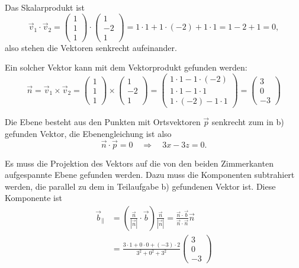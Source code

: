 \begin{loesung}
\begin{teilaufgaben}
\item Das Skalarprodukt ist
\[
\vec v_1\cdot\vec v_2
=
\begin{pmatrix}
1\\1\\1
\end{pmatrix}
\cdot
\begin{pmatrix}
1\\-2\\1
\end{pmatrix}
=1\cdot 1+1\cdot(-2)+1\cdot 1=1-2+1=0,
\]
also stehen die Vektoren senkrecht aufeinander.
\item Ein solcher Vektor kann mit dem Vektorprodukt gefunden werden:
\[
\vec n=\vec v_1\times\vec v_2
=
\begin{pmatrix}
1\\1\\1
\end{pmatrix}
\times
\begin{pmatrix}
1\\-2\\1
\end{pmatrix}
=
\begin{pmatrix}
1\cdot 1-1\cdot(-2)\\
1\cdot 1-1\cdot 1\\
1\cdot(-2)-1\cdot 1
\end{pmatrix}
=
\begin{pmatrix}
3\\0\\-3
\end{pmatrix}
\]
\item
Die Ebene besteht aus den Punkten mit Ortsvektoren $\vec p$
senkrecht zum in b) gefunden Vektor,
die Ebenengleichung ist also
\[
\vec n\cdot \vec p =0\quad\Rightarrow\quad 3x-3z=0.
\]
\item
Es muss die Projektion des Vektors auf die von den beiden Zimmerkanten
aufgespannte Ebene gefunden werden. Dazu muss die Komponenten
subtrahiert werden, die parallel zu dem in Teilaufgabe b) gefundenen
Vektor ist. Diese Komponente ist
\begin{align*}
\vec b_{\|}
&=
\left(\frac{\vec n}{|\vec n|}\cdot \vec b\right)\frac{\vec n}{|\vec n|}
=
\frac{\vec n\cdot\vec b}{\vec n\cdot \vec n} \vec n
\\
&
=
\frac{3\cdot 1+0\cdot 0+(-3)\cdot 2}{3^2+0^2+3^2}\begin{pmatrix}3\\0\\-3\end{pmatrix}

\end{align*}
\end{teilaufgaben}
\end{loesung}
